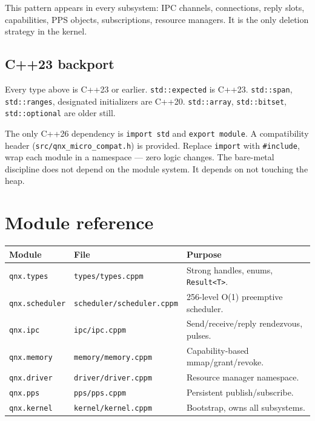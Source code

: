 \documentclass[11pt]{article}
\begin{document}
This pattern appears in every subsystem: IPC channels,
connections, reply slots, capabilities, PPS objects,
subscriptions, resource managers.  It is the only deletion
strategy in the kernel.

\subsection{C++23 backport}

Every type above is C++23 or earlier.  \texttt{std::expected}
is C++23.  \texttt{std::span}, \texttt{std::ranges}, designated
initializers are C++20.  \texttt{std::array}, \texttt{std::bitset},
\texttt{std::optional} are older still.

The only C++26 dependency is \texttt{import std} and
\texttt{export module}.  A compatibility header
(\texttt{src/qnx\_micro\_compat.h}) is provided.  Replace
\texttt{import} with \texttt{\#include}, wrap each module in a
namespace --- zero logic changes.  The bare-metal discipline
does not depend on the module system.  It depends on not
touching the heap.

\section{Module reference}

\begin{longtable}{llp{7cm}}
\toprule
\textbf{Module} & \textbf{File} & \textbf{Purpose} \\
\midrule
\texttt{qnx.types} & \texttt{types/types.cppm}
  & Strong handles, enums, \texttt{Result<T>}. \\
\texttt{qnx.scheduler} & \texttt{scheduler/scheduler.cppm}
  & 256-level O(1) preemptive scheduler. \\
\texttt{qnx.ipc} & \texttt{ipc/ipc.cppm}
  & Send/receive/reply rendezvous, pulses. \\
\texttt{qnx.memory} & \texttt{memory/memory.cppm}
  & Capability-based mmap/grant/revoke. \\
\texttt{qnx.driver} & \texttt{driver/driver.cppm}
  & Resource manager namespace. \\
\texttt{qnx.pps} & \texttt{pps/pps.cppm}
  & Persistent publish/subscribe. \\
\texttt{qnx.kernel} & \texttt{kernel/kernel.cppm}
  & Bootstrap, owns all subsystems. \\
\bottomrule
\end{longtable}
\end{document}
